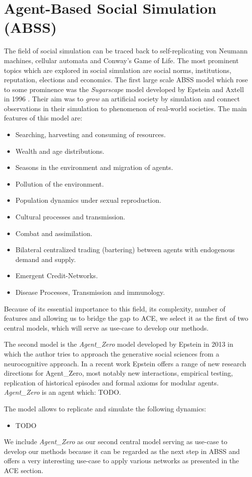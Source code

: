 \section{Agent-Based Social Simulation (ABSS)}
The field of social simulation can be traced back to self-replicating von Neumann machines, cellular automata and Conway's Game of Life. The most prominent topics which are explored in social simulation are social norms, institutions, reputation, elections and economics. The first large scale ABSS model which rose to some prominence was the \textit{Sugarscape} model developed by Epstein and Axtell in 1996 \cite{epstein_growing_1996}. Their aim was to \textit{grow} an artificial society by simulation and connect observations in their simulation to phenomenon of real-world societies. The main features of this model are:

\begin{itemize}
	\item Searching, harvesting and consuming of resources.
	\item Wealth and age distributions.
	\item Seasons in the environment and migration of agents.
	\item Pollution of the environment.
	\item Population dynamics under sexual reproduction.
	\item Cultural processes and transmission.
	\item Combat and assimilation.
	\item Bilateral centralized trading (bartering) between agents with endogenous demand and supply.
	\item Emergent Credit-Networks.
	\item Disease Processes, Transmission and immunology.
\end{itemize}

Because of its essential importance to this field, its complexity, number of features and allowing us to bridge the gap to ACE, we select it as the first of two central models, which will serve as use-case to develop our methods.

The second model is the \textit{Agent\_Zero} model developed by Epstein in 2013 \cite{epstein_agent_zero:_2014} in which the author tries to approach the generative social sciences from a neurocognitive approach. In a recent work \cite{epstein_advancing_2016} Epstein offers a range of new research directions for Agent\_Zero, most notably new interactions, empirical testing, replication of historical episodes and formal axioms for modular agents. 
\textit{Agent\_Zero} is an agent which: TODO. 

The model allows to replicate and simulate the following dynamics:

\begin{itemize}
	\item TODO
\end{itemize}

We include \textit{Agent\_Zero} as our second central model serving as use-case to develop our methods because it can be regarded as the next step in ABSS and offers a very interesting use-case to apply various networks as presented in the ACE section.